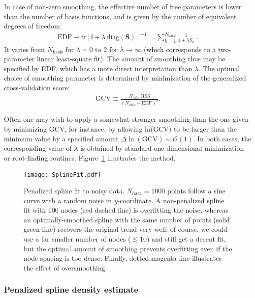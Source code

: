 \documentclass[12pt]{article}
\begin{document}
In case of non-zero smoothing, the effective number of free parameters is lower than the number of basis functions, and is given by the number of equivalent degrees of freedom:
\begin{align}
\mathrm{EDF} \equiv \mathrm{tr}[\mathsf{I} + \lambda\,\mathrm{diag}(\boldsymbol{S})]^{-1} =
\sum_{k=1}^{N_\mathrm{basis}} \frac{1}{1+\lambda S_k} \;.
\end{align}
It varies from $N_\mathrm{basis}$ for $\lambda=0$ to 2 for $\lambda\to\infty$ (which corresponds to a two-parameter linear least-square fit). The amount of smoothing thus may be specified by EDF, which has a more direct interpretation than $\lambda$. The optimal choice of smoothing parameter is determined by minimization of the generalized cross-validation score:
\begin{align}
\mathrm{GCV} \equiv \frac{N_\mathrm{data}\;\mathrm{RSS}}{(N_\mathrm{data}-\mathrm{EDF})^2}.
\end{align}

Often one may wish to apply a somewhat stronger smoothing than the one given by minimizing GCV, for instance, by allowing ln(GCV) to be larger than the minimum value by a specified amount $\Delta\mathrm{\ln(GCV)}\sim \mathcal{O}(1)$. In both cases, the corresponding value of $\lambda$ is  obtained by standard one-dimensional minimization or root-finding routines. Figure~\ref{fig:SplineFit} illustrates the method.

\begin{figure}[t]
\begin{center}
\texttt{[image: SplineFit.pdf]}
\end{center}
\caption{Penalized spline fit to noisy data. $N_\mathrm{data}=1000$ points follow a sine curve with a random noise in $y$-coordinate. A non-penalized spline fit with 100 nodes (red dashed line) is overfitting the noise, whereas an optimally-smoothed spline with the same number of points (solid green line) recovers the original trend very well; of course, we could use a far smaller number of nodes ($\lesssim 10$) and still get a decent fit, but the optimal amount of smoothing prevents overfitting even if the node spacing is too dense. Finally, dotted magenta line illustrates the effect of oversmoothing.
} \label{fig:SplineFit}
\end{figure}


\subsubsection{Penalized spline density estimate}  \label{sec:MathSplineDensityDetails}
\end{document}
